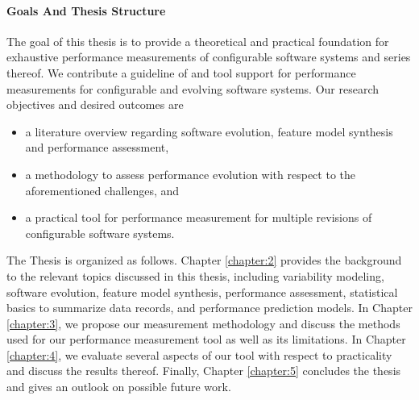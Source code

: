 \paragraph{Goals And Thesis Structure}

The goal of this thesis is to provide a theoretical and practical foundation for
exhaustive performance measurements of configurable software systems and series
thereof. We contribute a guideline of and tool support for performance
measurements for configurable and evolving software systems. Our research
objectives and desired outcomes are

\begin{itemize}
\item a literature overview regarding software evolution, feature model
synthesis and performance assessment,
\item a methodology to assess performance evolution with respect to the
aforementioned challenges, and
\item a practical tool for performance measurement for multiple revisions of
configurable software systems.
\end{itemize}

The Thesis is organized as follows. Chapter \ref{chapter:2} provides the
background to the relevant topics discussed in this thesis, including
variability modeling, software evolution, feature model synthesis, performance
assessment, statistical basics to summarize data records, and performance
prediction models.
In Chapter \ref{chapter:3}, we propose our measurement methodology and discuss
the methods used for our performance measurement tool as well as its
limitations. In Chapter \ref{chapter:4}, we evaluate several aspects of our
tool with respect to practicality and discuss the results thereof. Finally,
Chapter \ref{chapter:5} concludes the thesis and gives an outlook on possible
future work.
